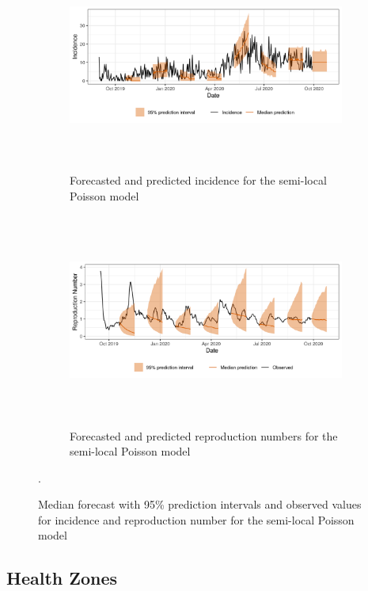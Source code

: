 \documentclass[12pt]{article}
\begin{document}
\begin{figure}[h!]
\begin{subfigure}{\textwidth}
  \centering
  \includegraphics[width=0.9\linewidth, height=7cm]{../output/national_predictions.png}  
  \caption{Forecasted and predicted incidence for the semi-local Poisson model}
  \label{fig:sub-first}
\end{subfigure}

\begin{subfigure}{\textwidth}
  \centering
  \includegraphics[width=0.9\linewidth, height=7cm]{../output/national_Rs.png}  
  \caption{Forecasted and predicted reproduction numbers for the semi-local Poisson model}
  \label{fig:sub-second}
\end{subfigure}
  \caption{Median forecast with 95\% prediction intervals and observed values for incidence and reproduction number for the semi-local Poisson model}.

  \label{fig:nat_pred}
\end{figure}

\subsection{Health Zones}
\end{document}
